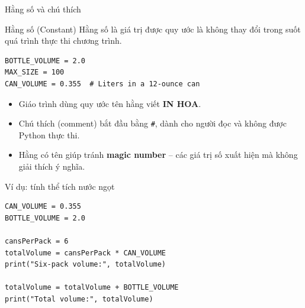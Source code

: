 \documentclass[aspectratio=169,10pt]{beamer}
\begin{document}
\begin{frame}[fragile]{Hằng số và chú thích}
\begin{block}{Hằng số (Constant)}
Hằng số là giá trị được quy ước là không thay đổi trong suốt quá trình thực thi chương trình.
\end{block}
\begin{lstlisting}
BOTTLE_VOLUME = 2.0
MAX_SIZE = 100
CAN_VOLUME = 0.355  # Liters in a 12-ounce can
\end{lstlisting}
\begin{itemize}
  \item Giáo trình dùng quy ước tên hằng viết \textbf{IN HOA}.
  \item Chú thích (comment) bắt đầu bằng \texttt{\#}, dành cho người đọc và không được Python thực thi.
  \item Hằng có tên giúp tránh \textbf{magic number} -- các giá trị số xuất hiện mà không giải thích ý nghĩa.
\end{itemize}
\end{frame}

\begin{frame}[fragile]{Ví dụ: tính thể tích nước ngọt}
\begin{lstlisting}
CAN_VOLUME = 0.355
BOTTLE_VOLUME = 2.0

cansPerPack = 6
totalVolume = cansPerPack * CAN_VOLUME
print("Six-pack volume:", totalVolume)

totalVolume = totalVolume + BOTTLE_VOLUME
print("Total volume:", totalVolume)
\end{lstlisting}
\begin{center}
\end{center}
\end{frame}
\end{document}
